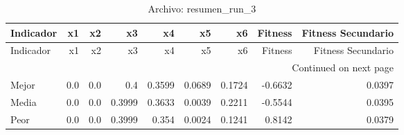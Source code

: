 \begin{longtable}{lrrrrrrrr}
\caption{Archivo: resumen\_run\_3}\label{tab:resumen_run_3} \\
\toprule
Indicador & x1 & x2 & x3 & x4 & x5 & x6 & Fitness & Fitness Secundario \\
\midrule
\endfirsthead
\toprule
Indicador & x1 & x2 & x3 & x4 & x5 & x6 & Fitness & Fitness Secundario \\
\midrule
\endhead
\midrule
\multicolumn{9}{r}{Continued on next page} \\
\midrule
\endfoot
\bottomrule
\endlastfoot
Mejor & 0.0 & 0.0 & 0.4 & 0.3599 & 0.0689 & 0.1724 & -0.6632 & 0.0397 \\
Media & 0.0 & 0.0 & 0.3999 & 0.3633 & 0.0039 & 0.2211 & -0.5544 & 0.0395 \\
Peor & 0.0 & 0.0 & 0.3999 & 0.354 & 0.0024 & 0.1241 & 0.8142 & 0.0379 \\
\end{longtable}